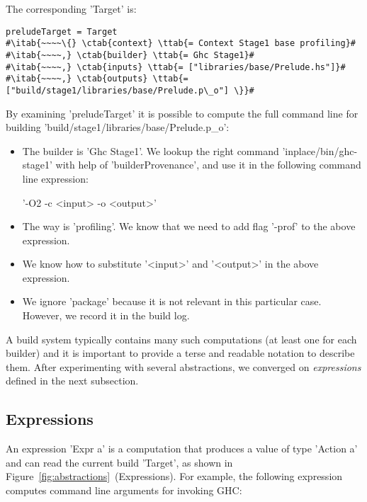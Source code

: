 \noindent The corresponding \lst'Target' is:

\begin{lstlisting}
preludeTarget = Target
#\itab{~~~~\{} \ctab{context} \ttab{= Context Stage1 base profiling}#
#\itab{~~~~,} \ctab{builder} \ttab{= Ghc Stage1}#
#\itab{~~~~,} \ctab{inputs} \ttab{= ["libraries/base/Prelude.hs"]}#
#\itab{~~~~,} \ctab{outputs} \ttab{= ["build/stage1/libraries/base/Prelude.p\_o"] \}}#
\end{lstlisting}

\noindent By examining \lst'preludeTarget' it is possible to compute the full
command line for building \lst'build/stage1/libraries/base/Prelude.p_o':
\begin{itemize}
  \item The builder is \lst'Ghc Stage1'. We lookup the right command
  \lst'inplace/bin/ghc-stage1' with help of \lst'builderProvenance', and use it
  in the following command line expression:\vspace{1mm}\\
  \centerline{\!\!\!\!\!\lst'-O2 -c <input> -o <output>'}
  \item The way is \lst'profiling'. We know that we need to add
  flag \lst'-prof' to the above expression.
  \item We know how to substitute \lst'<input>' and \lst'<output>' in the
  above expression.
  \item We ignore \lst'package' because it is not relevant in this particular
  case. However, we record it in the build log.
\end{itemize}

\noindent A build system typically contains many such computations (at least one
for each builder) and it is important to provide a terse and readable notation to
describe them. After experimenting with several abstractions, we converged on
\emph{expressions} defined in the next subsection.

\subsection{Expressions\label{sec:expressions}}

An expression \lst'Expr a' is a computation that produces a value of type
\lst'Action a' and can read the current build \lst'Target', as shown in
Figure~\ref{fig:abstractions}~(Expressions). For example,
the following expression computes command line arguments for invoking GHC:

\newcommand{\altab}[1]{\hspace{.05\textwidth}\rlap{#1}}

